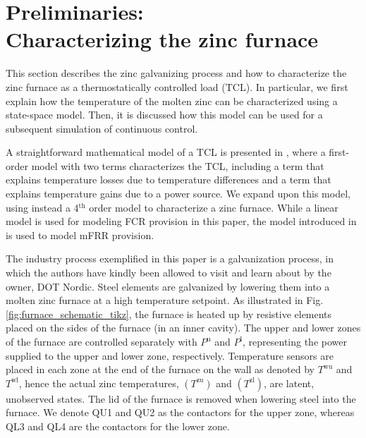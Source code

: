 \documentclass[conference]{IEEEtran}
\begin{document}
\section{Preliminaries: \\ Characterizing the zinc furnace}\label{sec:zinc_furnace_description}
\vspace{-1mm}
%
This section describes the zinc galvanizing process and how to characterize the zinc furnace as a thermostatically controlled load (TCL). In particular, we first explain how the temperature of the molten zinc can be characterized using a state-space model. Then, it is discussed how this model can be used for a subsequent simulation of continuous control. 

A straightforward mathematical model of a TCL is presented in  \cite{hao2014aggregate}, where a first-order model with two terms characterizes the TCL, including a term that explains temperature losses due to temperature differences and a term that explains temperature gains due to a power source. We expand upon this model, using instead a 4$^{\text{th}}$ order model to characterize a zinc furnace. While a linear model is used for modeling FCR provision in this paper, the model introduced in \cite{gade2023load} is used to model mFRR provision.


The industry process exemplified in this paper is a galvanization process, in which the authors have kindly been allowed to visit and learn about by the owner, DOT Nordic. Steel elements are galvanized by lowering them into a molten zinc furnace at a high temperature setpoint. As illustrated in Fig. \ref{fig:furnace_schematic_tikz}, the furnace is heated up by resistive elements placed on the sides of the furnace (in an inner cavity). The upper and lower zones of the furnace are controlled separately with $P^{\text{u}}$ and $P^{\text{l}}$, representing the power supplied to the upper and lower zone, respectively. Temperature sensors are placed in each zone at the end of the furnace on the wall as denoted by $T^{\text{wu}}$ and $T^{\text{wl}}$, hence the actual zinc temperatures, $(T^{\text{zu}})$ and $(T^{\text{zl}})$, are latent, unobserved states. The lid of the furnace is removed when lowering steel into the furnace. We denote QU1 and QU2 as the contactors for the upper zone, whereas QL3 and QL4 are the contactors for the lower zone.
\end{document}
